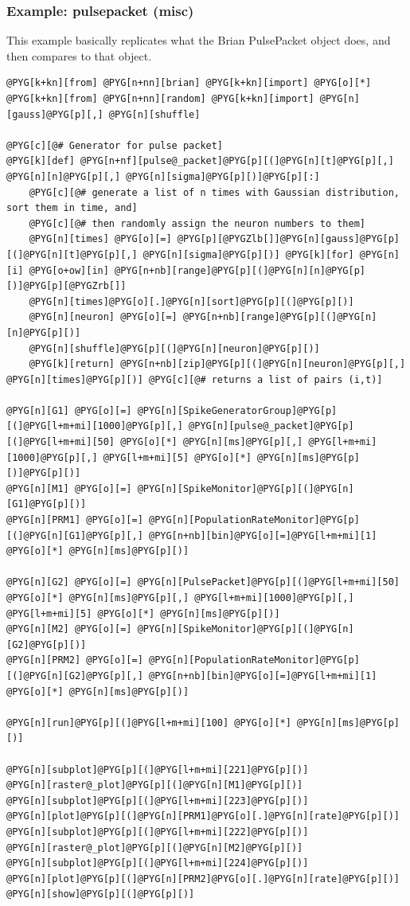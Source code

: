 \documentclass[letterpaper,10pt,english]{manual}
\begin{document}
\hypertarget{index-61}{}\subsubsection{Example: pulsepacket (misc)}

This example basically replicates what the Brian PulsePacket object does,
and then compares to that object.

\begin{Verbatim}[commandchars=@\[\]]
@PYG[k+kn][from] @PYG[n+nn][brian] @PYG[k+kn][import] @PYG[o][*]
@PYG[k+kn][from] @PYG[n+nn][random] @PYG[k+kn][import] @PYG[n][gauss]@PYG[p][,] @PYG[n][shuffle]

@PYG[c][@# Generator for pulse packet]
@PYG[k][def] @PYG[n+nf][pulse@_packet]@PYG[p][(]@PYG[n][t]@PYG[p][,] @PYG[n][n]@PYG[p][,] @PYG[n][sigma]@PYG[p][)]@PYG[p][:]
    @PYG[c][@# generate a list of n times with Gaussian distribution, sort them in time, and]
    @PYG[c][@# then randomly assign the neuron numbers to them]
    @PYG[n][times] @PYG[o][=] @PYG[p][@PYGZlb[]]@PYG[n][gauss]@PYG[p][(]@PYG[n][t]@PYG[p][,] @PYG[n][sigma]@PYG[p][)] @PYG[k][for] @PYG[n][i] @PYG[o+ow][in] @PYG[n+nb][range]@PYG[p][(]@PYG[n][n]@PYG[p][)]@PYG[p][@PYGZrb[]]
    @PYG[n][times]@PYG[o][.]@PYG[n][sort]@PYG[p][(]@PYG[p][)]
    @PYG[n][neuron] @PYG[o][=] @PYG[n+nb][range]@PYG[p][(]@PYG[n][n]@PYG[p][)]
    @PYG[n][shuffle]@PYG[p][(]@PYG[n][neuron]@PYG[p][)]
    @PYG[k][return] @PYG[n+nb][zip]@PYG[p][(]@PYG[n][neuron]@PYG[p][,] @PYG[n][times]@PYG[p][)] @PYG[c][@# returns a list of pairs (i,t)]

@PYG[n][G1] @PYG[o][=] @PYG[n][SpikeGeneratorGroup]@PYG[p][(]@PYG[l+m+mi][1000]@PYG[p][,] @PYG[n][pulse@_packet]@PYG[p][(]@PYG[l+m+mi][50] @PYG[o][*] @PYG[n][ms]@PYG[p][,] @PYG[l+m+mi][1000]@PYG[p][,] @PYG[l+m+mi][5] @PYG[o][*] @PYG[n][ms]@PYG[p][)]@PYG[p][)]
@PYG[n][M1] @PYG[o][=] @PYG[n][SpikeMonitor]@PYG[p][(]@PYG[n][G1]@PYG[p][)]
@PYG[n][PRM1] @PYG[o][=] @PYG[n][PopulationRateMonitor]@PYG[p][(]@PYG[n][G1]@PYG[p][,] @PYG[n+nb][bin]@PYG[o][=]@PYG[l+m+mi][1] @PYG[o][*] @PYG[n][ms]@PYG[p][)]

@PYG[n][G2] @PYG[o][=] @PYG[n][PulsePacket]@PYG[p][(]@PYG[l+m+mi][50] @PYG[o][*] @PYG[n][ms]@PYG[p][,] @PYG[l+m+mi][1000]@PYG[p][,] @PYG[l+m+mi][5] @PYG[o][*] @PYG[n][ms]@PYG[p][)]
@PYG[n][M2] @PYG[o][=] @PYG[n][SpikeMonitor]@PYG[p][(]@PYG[n][G2]@PYG[p][)]
@PYG[n][PRM2] @PYG[o][=] @PYG[n][PopulationRateMonitor]@PYG[p][(]@PYG[n][G2]@PYG[p][,] @PYG[n+nb][bin]@PYG[o][=]@PYG[l+m+mi][1] @PYG[o][*] @PYG[n][ms]@PYG[p][)]

@PYG[n][run]@PYG[p][(]@PYG[l+m+mi][100] @PYG[o][*] @PYG[n][ms]@PYG[p][)]

@PYG[n][subplot]@PYG[p][(]@PYG[l+m+mi][221]@PYG[p][)]
@PYG[n][raster@_plot]@PYG[p][(]@PYG[n][M1]@PYG[p][)]
@PYG[n][subplot]@PYG[p][(]@PYG[l+m+mi][223]@PYG[p][)]
@PYG[n][plot]@PYG[p][(]@PYG[n][PRM1]@PYG[o][.]@PYG[n][rate]@PYG[p][)]
@PYG[n][subplot]@PYG[p][(]@PYG[l+m+mi][222]@PYG[p][)]
@PYG[n][raster@_plot]@PYG[p][(]@PYG[n][M2]@PYG[p][)]
@PYG[n][subplot]@PYG[p][(]@PYG[l+m+mi][224]@PYG[p][)]
@PYG[n][plot]@PYG[p][(]@PYG[n][PRM2]@PYG[o][.]@PYG[n][rate]@PYG[p][)]
@PYG[n][show]@PYG[p][(]@PYG[p][)]
\end{Verbatim}
\end{document}
